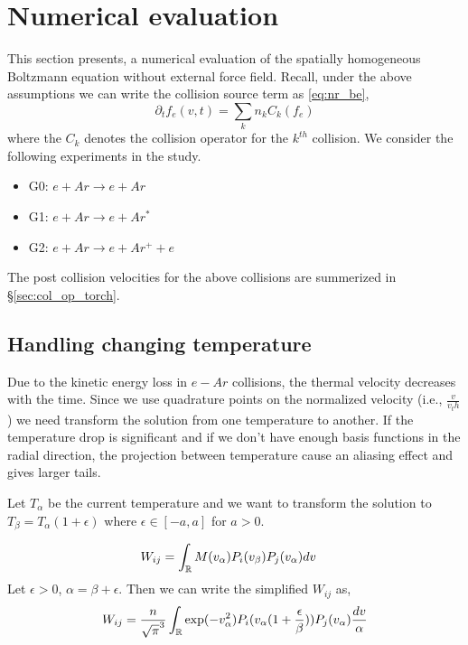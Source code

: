 \documentclass{article}[draft]
\begin{document}
\newpage
\section{Numerical evaluation}
This section presents, a numerical evaluation of the spatially homogeneous Boltzmann equation without external force field. Recall, under the above assumptions we can write the collision source term as \eqref{eq:nr_be}, 
\begin{equation}
	\partial_t f_e(v,t) = \sum_{k} n_k C_k(f_e) \label{eq:nr_be}
\end{equation} where the $C_k$ denotes the collision operator for the $k^{th}$ collision. We consider the following experiments in the study. 
\begin{itemize}
\item G0: $e + Ar \rightarrow e + Ar $ 
\item G1: $e + Ar \rightarrow e + Ar^*$
\item G2: $e + Ar \rightarrow e + Ar^+ + e$ 
\end{itemize} The post collision velocities for the above collisions are summerized in \S\ref{sec:col_op_torch}.


\subsection{Handling changing temperature}
Due to the kinetic energy loss in $e-Ar$ collisions, the thermal velocity decreases with the time. Since we use quadrature points on the normalized velocity (i.e., $\frac{v}{v_th}$) we need transform the solution from one temperature to another. If the temperature drop is significant and if we don't have enough basis functions in the radial direction, the projection between temperature cause an aliasing effect and gives larger tails. 

Let $T_\alpha$ be the current temperature and we want to transform the solution to $T_\beta=T_\alpha (1+ \epsilon)$ where $\epsilon \in [-a,a]$ for $a>0$.

\begin{align}
W_{ij} &= \int_{\mathbb{R}} M(v_\alpha) P_i(v_\beta) P_j(v_\alpha)dv \label{eq:basis_change}
\end{align}
Let $\epsilon >0$, $\alpha = \beta + \epsilon$. Then we can write the simplified $W_{ij}$ as, 
\begin{align}
W_{ij} &= \frac{n}{\sqrt{\pi}^{3}}  \int_{\mathbb{R}}  \exp(-v_\alpha^2) P_i (v_\alpha (1 + \frac{\epsilon}{\beta})) P_j(v_\alpha) \frac{dv}{\alpha} \\
\end{align}
\end{document}
